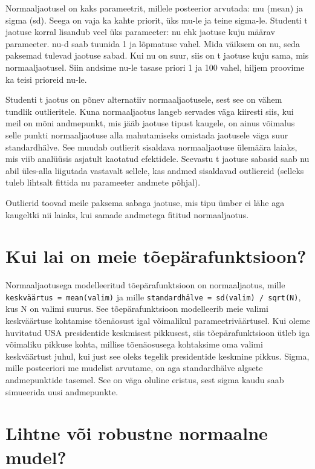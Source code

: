 \documentclass[]{book}
\begin{document}
Normaaljaotusel on kaks parameetrit, millele posteerior arvutada: mu
(mean) ja sigma (sd). Seega on vaja ka kahte priorit, üks mu-le ja teine
sigma-le. Studenti t jaotuse korral lisandub veel üks parameeter: nu ehk
jaotuse kuju määrav parameeter. nu-d saab tuunida 1 ja lõpmatuse vahel.
Mida väiksem on nu, seda paksemad tulevad jaotuse sabad. Kui nu on suur,
siis on t jaotuse kuju sama, mis normaaljaotusel. Siin andsime nu-le
tasase priori 1 ja 100 vahel, hiljem proovime ka teisi prioreid nu-le.

Studenti t jaotus on põnev alternatiiv normaaljaotusele, sest see on
vähem tundlik outlieritele. Kuna normaaljaotus langeb servades väga
kiiresti siis, kui meil on mõni andmepunkt, mis jääb jaotuse tipust
kaugele, on ainus võimalus selle punkti normaaljaotuse alla mahutamiseks
omistada jaotusele väga suur standardhälve. See muudab outlierit
sisaldava normaaljaotuse ülemäära laiaks, mis viib analüüsis asjatult
kaotatud efektidele. Seevastu t jaotuse sabasid saab nu abil üles-alla
liigutada vastavalt sellele, kas andmed sisaldavad outliereid (selleks
tuleb lihtsalt fittida nu parameeter andmete põhjal).

Outlierid toovad meile paksema sabaga jaotuse, mis tipu ümber ei lähe
aga kaugeltki nii laiaks, kui samade andmetega fititud normaaljaotus.

\section*{Kui lai on meie
tõepärafunktsioon?}\label{kui-lai-on-meie-toeparafunktsioon}

Normaaljaotusega modelleeritud tõepärafunktsioon on normaaljaotus, mille
\texttt{keskväärtus\ =\ mean(valim)} ja mille
\texttt{standardhälve\ =\ sd(valim)\ /\ sqrt(N)}, kus N on valimi
suurus. See tõepärafunktsioon modelleerib meie valimi keskväärtuse
kohtamise tõenäosust igal võimalikul parameetriväärtusel. Kui oleme
huvitatud USA presidentide keskmisest pikkusest, siis tõepärafunktsioon
ütleb iga võimaliku pikkuse kohta, millise tõenäosusega kohtaksime oma
valimi keskväärtust juhul, kui just see oleks tegelik presidentide
keskmine pikkus. Sigma, mille posteeriori me mudelist arvutame, on aga
standardhälve algsete andmepunktide tasemel. See on väga oluline
eristus, sest sigma kaudu saab simueerida uusi andmepunkte.

\section*{Lihtne või robustne normaalne
mudel?}\label{lihtne-voi-robustne-normaalne-mudel}
\end{document}
